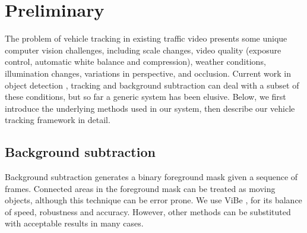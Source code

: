 \section{Preliminary}
\label{sec:tracker-preliminary}

The problem of vehicle tracking in existing traffic video presents some unique computer vision challenges, including scale changes, video quality (exposure control, automatic white balance and compression), weather conditions, illumination changes, variations in perspective, and occlusion.
Current work in object detection 
\cite{viola2001rapid,dalal2005histograms,felzenszwalb2010cascade,girshick2014rich}, 
tracking \cite{henriques2015high,hare2011struck,vojir2014robust}
and background subtraction \cite{barnich2011vibe,zivkovic2006efficient}
can deal with a subset of these conditions, but so far a generic system has been elusive. Below, we first introduce the underlying methods used in our system, then describe our vehicle tracking framework in detail. 


\subsection{Background subtraction}
Background subtraction generates a binary foreground mask given a sequence of frames. Connected areas in the foreground mask can be treated as moving objects, although this technique can be error prone. 
We use ViBe \cite{barnich2011vibe}, for its balance of speed, robustness and accuracy. However, other methods 
can be substituted with acceptable results in many cases.

